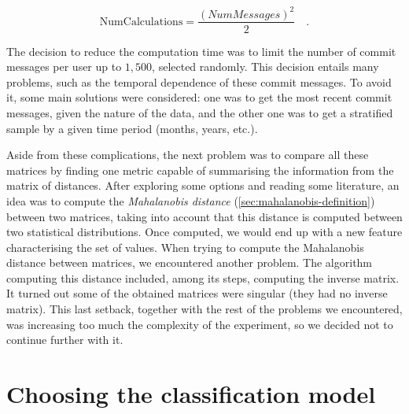 \documentclass[a4paper, 12pt]{book}
\begin{document}
\begin{center}
    \begin{equation}
    \mathrm{NumCalculations} = \frac{( NumMessages )^2}{2} \quad.
    \end{equation}
\end{center}

The decision to reduce the computation time was to limit the number of commit messages per user up to $1,500$, selected randomly. This decision entails many problems, such as the temporal dependence of these commit messages. To avoid it, some main solutions were considered: one was to get the most recent commit messages, given the nature of the data, and the other one was to get a stratified sample by a given time period (months, years, etc.).

Aside from these complications, the next problem was to compare all these matrices by finding one metric capable of summarising the information from the matrix of distances. After exploring some options and reading some literature, an idea was to compute the \textit{Mahalanobis distance} (\ref{sec:mahalanobis-definition}) between two matrices, taking into account that this distance is computed between two statistical distributions. Once computed, we would end up with a new feature characterising the set of values. When trying to compute the Mahalanobis distance between matrices, we encountered another problem. The algorithm computing this distance included, among its steps, computing the inverse matrix. It turned out some of the obtained matrices were singular (they had no inverse matrix). This last setback, together with the rest of the problems we encountered, was increasing too much the complexity of the experiment, so we decided not to continue further with it.

\section{Choosing the classification model} 
\label{sec:exp-classification-models}

\end{document}
